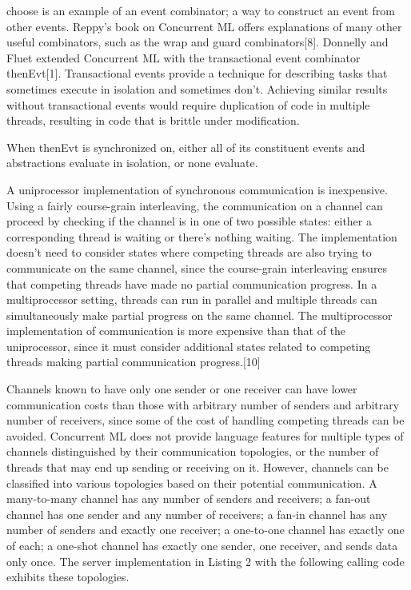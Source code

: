 \documentclass{article}
\begin{document}
choose is an example of an event combinator; a way to construct an event from other events.
Reppy's book on Concurrent ML offers explanations of many other useful combinators, such as the
wrap and guard combinators[8].  Donnelly and Fluet extended Concurrent ML with the
transactional event combinator thenEvt[1].  Transactional events provide a technique for
describing tasks that sometimes execute in isolation and sometimes don't.  Achieving similar
results without transactional events would require duplication of code in multiple threads,
resulting in code that is brittle under modification.

When  thenEvt is synchronized on, either all of its constituent events and abstractions
evaluate in isolation, or none evaluate.


A uniprocessor implementation of synchronous communication is inexpensive.  Using a fairly
course-grain interleaving, the communication on a channel can proceed by checking if the
channel is in one of two possible states: either a corresponding thread is waiting or there's
nothing waiting.  The implementation doesn't need to consider states where competing threads
are also trying to communicate on the same channel, since the course-grain interleaving ensures
that competing threads have made no partial communication progress.  In a multiprocessor
setting, threads can run in parallel and multiple threads can simultaneously make partial
progress on the same channel.  The multiprocessor implementation of communication is more
expensive than that of the uniprocessor, since it must consider additional states related to
competing threads making partial communication progress.[10]

Channels known to have only one sender or one receiver can have lower communication costs than
those with arbitrary number of senders and arbitrary number of receivers, since some of the
cost of handling competing threads can be avoided.  Concurrent ML does not provide language
features for multiple types of channels distinguished by their communication topologies, or the
number of threads that may end up sending or receiving on it.  However, channels can be
classified into various topologies based on their potential communication.  A many-to-many
channel has any number of senders and receivers; a fan-out channel has one sender and any
number of receivers; a fan-in channel has any number of senders and exactly one receiver; a
one-to-one channel has exactly one of each; a one-shot channel has exactly one sender, one
receiver, and sends data only once.  The server implementation in Listing 2  with the following
calling code exhibits these topologies.
\end{document}
